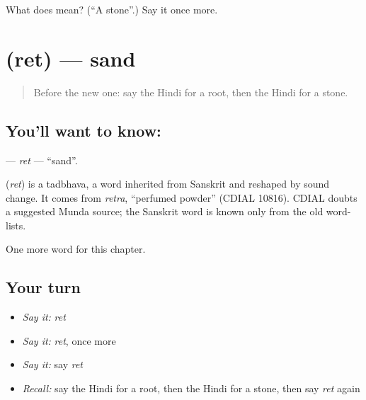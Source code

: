 \begin{tcolorbox}[breakable,colback=teal!4,colframe=teal!35!black,title={Before you move on}]
What does  mean? (\textquotedblleft{}A stone\textquotedblright{}.) Say it once more.
\end{tcolorbox}
\section[\texorpdfstring{\hi{रेत} (ret)}{रेत (ret)}]{ (ret) — sand}

\label{lesson:HI-C144-ret}



\begin{quote}
Before the new one: say the Hindi for a root, then the Hindi for a stone.
\end{quote}

\subsection*{You'll want to know: }
\textbf{} — \emph{ret} — \textquotedblleft{}sand\textquotedblright{}.

\begin{cousinweb}
\textbf{} (\emph{ret}) is a tadbhava, a word inherited from Sanskrit and reshaped by sound change. It comes from \emph{retra}, \textquotedblleft{}perfumed powder\textquotedblright{} (CDIAL 10816). CDIAL doubts a suggested Munda source; the Sanskrit word is known only from the old word-lists.
\end{cousinweb}

\begin{grammarlens}[title={What you've built}]
One more word for this chapter.
\end{grammarlens}

\subsection*{Your turn}
\begin{itemize}
\raggedright
  \item \emph{Say it:} \emph{ret}
  \item \emph{Say it:} \emph{ret}, once more
  \item \emph{Say it:} say \emph{ret}
  \item \emph{Recall:} say the Hindi for a root, then the Hindi for a stone, then say \emph{ret} again
\end{itemize}

